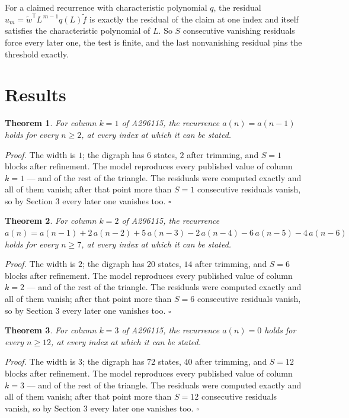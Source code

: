 \documentclass[11pt]{article}
\newtheorem{theorem}{Theorem}
\theoremstyle{definition}
\begin{document}
For a claimed recurrence with characteristic polynomial $q$, the residual $u_m = \tilde w^{\mathsf T}L^{\,m-1}q(L)\tilde f$ is exactly the residual of the claim at one index and itself satisfies the characteristic polynomial of $L$. So $S$ consecutive vanishing residuals force every later one, the test is finite, and the last nonvanishing residual pins the threshold exactly.

\section{Results}

\begin{theorem} For column $k = 1$ of A296115, the recurrence $a(n) = a(n-1)$ holds for every $n \ge 2$, at every index at which it can be stated.\end{theorem}

{\itshape Proof.} The width is $1$; the digraph has $6$ states, $2$ after trimming, and $S = 1$ blocks after refinement. The model reproduces every published value of column $k = 1$ --- and of the rest of the triangle. The residuals were computed exactly and all of them vanish; after that point more than $S = 1$ consecutive residuals vanish, so by Section 3 every later one vanishes too. $\square$

\begin{theorem} For column $k = 2$ of A296115, the recurrence $a(n) = a(n-1) + 2\,a(n-2) + 5\,a(n-3) - 2\,a(n-4) - 6\,a(n-5) - 4\,a(n-6)$ holds for every $n \ge 7$, at every index at which it can be stated.\end{theorem}

{\itshape Proof.} The width is $2$; the digraph has $20$ states, $14$ after trimming, and $S = 6$ blocks after refinement. The model reproduces every published value of column $k = 2$ --- and of the rest of the triangle. The residuals were computed exactly and all of them vanish; after that point more than $S = 6$ consecutive residuals vanish, so by Section 3 every later one vanishes too. $\square$

\begin{theorem} For column $k = 3$ of A296115, the recurrence $a(n) = 0$ holds for every $n \ge 12$, at every index at which it can be stated.\end{theorem}

{\itshape Proof.} The width is $3$; the digraph has $72$ states, $40$ after trimming, and $S = 12$ blocks after refinement. The model reproduces every published value of column $k = 3$ --- and of the rest of the triangle. The residuals were computed exactly and all of them vanish; after that point more than $S = 12$ consecutive residuals vanish, so by Section 3 every later one vanishes too. $\square$
\end{document}
